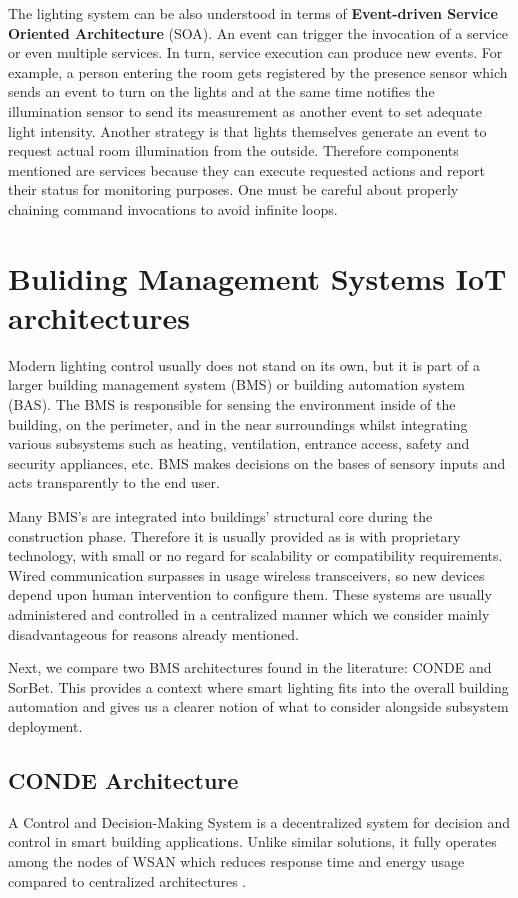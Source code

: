 \documentclass[11pt, english, a4paper, twoside]{article}
\begin{document}
The lighting system can be also understood in terms of \textbf{Event-driven Service Oriented Architecture} (SOA). An event can trigger the invocation of a service or even multiple services. In turn, service execution can produce new events. For example, a person entering the room gets registered by the presence sensor which sends an event to turn on the lights and at the same time notifies the illumination sensor to send its measurement as another event to set adequate light intensity. Another strategy is that lights themselves generate an event to request actual room illumination from the outside. Therefore components mentioned are services because they can execute requested actions and report their status for monitoring purposes. One must be careful about properly chaining command invocations to avoid infinite loops.

\section{Buliding Management Systems IoT architectures} \label{bms}
Modern lighting control usually does not stand on its own, but it is part of a larger building management system (BMS) or building automation system (BAS). The BMS is responsible for sensing the environment inside of the building, on the perimeter, and in the near surroundings whilst integrating various subsystems such as heating, ventilation, entrance access, safety and security appliances, etc. BMS makes decisions on the bases of sensory inputs and acts transparently to the end user.

Many BMS's are integrated into buildings' structural core during the construction phase. Therefore it is usually provided as is with proprietary technology, with small or no regard for scalability or compatibility requirements. Wired communication surpasses in usage wireless transceivers, so new devices depend upon human intervention to configure them. These systems are usually administered and controlled in a centralized manner which we consider mainly disadvantageous for reasons already mentioned.

Next, we compare two BMS architectures found in the literature: CONDE and SorBet. This provides a context where smart lighting fits into the overall building automation and gives us a clearer notion of what to consider alongside subsystem deployment.

\subsection{CONDE Architecture}
A Control and Decision-Making System is a decentralized system for decision and control in smart building applications. Unlike similar solutions, it fully operates among the nodes of WSAN which reduces response time and energy usage compared to centralized architectures \cite{farias_control_2013}. 
\end{document}
